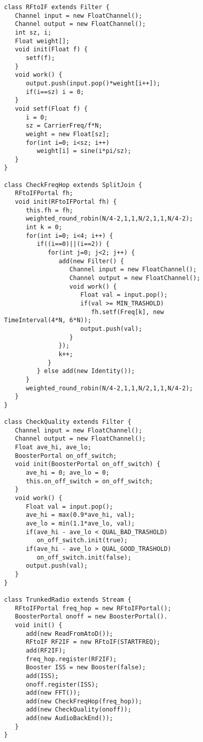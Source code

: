 \begin{figure}[t]
\scriptsize
\begin{verbatim}
class RFtoIF extends Filter {
   Channel input = new FloatChannel();
   Channel output = new FloatChannel();
   int sz, i;
   Float weight[];
   void init(Float f) {
      setf(f);
   }
   void work() {
      output.push(input.pop()*weight[i++]);
      if(i==sz) i = 0;
   }
   void setf(Float f) {
      i = 0;
      sz = CarrierFreq/f*N;
      weight = new Float[sz];
      for(int i=0; i<sz; i++)
         weight[i] = sine(i*pi/sz);
   }
}

class CheckFreqHop extends SplitJoin {
   RFtoIFPortal fh;
   void init(RFtoIFPortal fh) {
      this.fh = fh;
      weighted_round_robin(N/4-2,1,1,N/2,1,1,N/4-2);
      int k = 0;
      for(int i=0; i<4; i++) {
         if((i==0)||(i==2)) {
            for(int j=0; j<2; j++) {
               add(new Filter() {
                  Channel input = new FloatChannel();
                  Channel output = new FloatChannel();
                  void work() {
                     Float val = input.pop();
                     if(val >= MIN_TRASHOLD) 
                        fh.setf(Freq[k], new TimeInterval(4*N, 6*N)); 
                     output.push(val);
                  }
               });
               k++;
            }
         } else add(new Identity());
      }
      weighted_round_robin(N/4-2,1,1,N/2,1,1,N/4-2);
   }
}

class CheckQuality extends Filter {
   Channel input = new FloatChannel();
   Channel output = new FloatChannel();
   Float ave_hi, ave_lo;   
   BoosterPortal on_off_switch;
   void init(BoosterPortal on_off_switch) {
      ave_hi = 0; ave_lo = 0;
      this.on_off_switch = on_off_switch;
   }
   void work() {
      Float val = input.pop();
      ave_hi = max(0.9*ave_hi, val);
      ave_lo = min(1.1*ave_lo, val);
      if(ave_hi - ave_lo < QUAL_BAD_TRASHOLD)
         on_off_switch.init(true);
      if(ave_hi - ave_lo > QUAL_GOOD_TRASHOLD)
         on_off_switch.init(false);
      output.push(val);
   }
}

class TrunkedRadio extends Stream {
   RFtoIFPortal freq_hop = new RFtoIFPortal();
   BoosterPortal onoff = new BoosterPortal().
   void init() {
      add(new ReadFromAtoD());
      RFtoIF RF2IF = new RFtoIF(STARTFREQ);
      add(RF2IF);
      freq_hop.register(RF2IF);
      Booster ISS = new Booster(false);
      add(ISS);
      onoff.register(ISS);
      add(new FFT());
      add(new CheckFreqHop(freq_hop));
      add(new CheckQuality(onoff));
      add(new AudioBackEnd());
   }
}
\end{verbatim}
\vspace{-12pt}
\end{figure}
